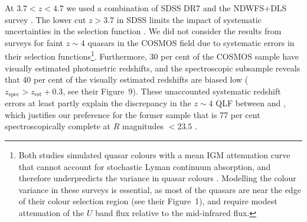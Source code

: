 \documentclass[fleqn,usenatbib]{mnras}
\begin{document}
At $3.7<z<4.7$ we used a combination of SDSS DR7 \citep[1785 uniformly
  selected quasars from][]{2010AJ....139.2360S} and the NDWFS$+$DLS
survey \citep{2010ApJ...710.1498G,2011ApJ...728L..26G}. The lower cut
$z>3.7$ in SDSS limits the impact of systematic uncertainties in the
\citet{2006AJ....131.2766R} selection function
\citep{2009ApJ...705L.113P, 2011ApJ...728...23W}. We did not consider
the results from surveys for faint $z\sim 4$ quasars in the COSMOS
field \citep{2011ApJ...728L..25I, 2012ApJ...755..169M} due to
systematic errors in their selection functions\footnote{Both studies
  simulated quasar colours with a mean IGM attenuation curve
  \citep{1995ApJ...441...18M} that cannot account for stochastic Lyman
  continuum absorption, and therefore underpredicts the variance in
  quasar colours \citep{1999ApJ...518..103B, 2008MNRAS.387.1681I,
    2011ApJ...728...23W}. Modelling the colour variance in these
  surveys is essential, as most of the \citet{2011ApJ...728L..25I}
  quasars are near the edge of their colour selection region (see
  their Figure~1), and \citet{2012ApJ...755..169M} require modest
  attenuation of the $U$ band flux relative to the mid-infrared
  flux.}. Furthermore, 30 per cent of the \citet{2012ApJ...755..169M}
COSMOS sample have visually estimated photometric redshifts, and the
spectroscopic subsample reveals that 40 per cent of the visually
estimated redshifts are biased low
($z_\mathrm{spec}>z_\mathrm{est}+0.3$, see their Figure~9). These
unaccounted systematic redshift errors at least partly explain the
discrepancy in the $z\sim 4$ QLF between \citet{2011ApJ...728L..26G}
and \citet{2012ApJ...755..169M}, which justifies our preference for
the former sample that is 77 per cent spectroscopically complete at
$R$ magnitudes $<23.5$ \citep{2011ApJ...728L..26G}.
\end{document}
